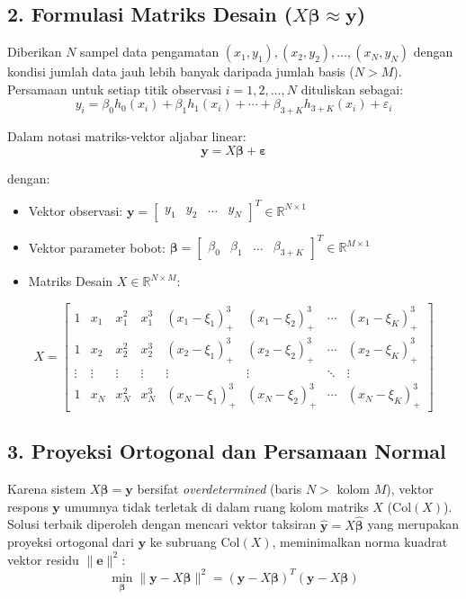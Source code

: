 \documentclass[12pt,a4paper]{report}
\begin{document}
\subsection*{2. Formulasi Matriks Desain ($X\boldsymbol{\beta} \approx \mathbf{y}$)}
Diberikan $N$ sampel data pengamatan $(x_1, y_1), (x_2, y_2), \dots, (x_N, y_N)$ dengan kondisi jumlah data jauh lebih banyak daripada jumlah basis ($N > M$). Persamaan untuk setiap titik observasi $i = 1, 2, \dots, N$ dituliskan sebagai:
\[
y_i = \beta_0 h_0(x_i) + \beta_1 h_1(x_i) + \cdots + \beta_{3+K} h_{3+K}(x_i) + \varepsilon_i
\]

Dalam notasi matriks-vektor aljabar linear:
\[
\mathbf{y} = X\boldsymbol{\beta} + \boldsymbol{\varepsilon}
\]

dengan:
\begin{itemize}[noitemsep]
    \item Vektor observasi: $\mathbf{y} = \begin{bmatrix} y_1 & y_2 & \dots & y_N \end{bmatrix}^T \in \mathbb{R}^{N \times 1}$
    \item Vektor parameter bobot: $\boldsymbol{\beta} = \begin{bmatrix} \beta_0 & \beta_1 & \dots & \beta_{3+K} \end{bmatrix}^T \in \mathbb{R}^{M \times 1}$
    \item Matriks Desain $X \in \mathbb{R}^{N \times M}$:
\end{itemize}

\[
X = \begin{bmatrix}
1 & x_1 & x_1^2 & x_1^3 & (x_1 - \xi_1)_+^3 & (x_1 - \xi_2)_+^3 & \cdots & (x_1 - \xi_K)_+^3 \\
1 & x_2 & x_2^2 & x_2^3 & (x_2 - \xi_1)_+^3 & (x_2 - \xi_2)_+^3 & \cdots & (x_2 - \xi_K)_+^3 \\
\vdots & \vdots & \vdots & \vdots & \vdots & \vdots & \ddots & \vdots \\
1 & x_N & x_N^2 & x_N^3 & (x_N - \xi_1)_+^3 & (x_N - \xi_2)_+^3 & \cdots & (x_N - \xi_K)_+^3
\end{bmatrix}
\]

\subsection*{3. Proyeksi Ortogonal dan Persamaan Normal}
Karena sistem $X\boldsymbol{\beta} = \mathbf{y}$ bersifat \textit{overdetermined} (baris $N >$ kolom $M$), vektor respons $\mathbf{y}$ umumnya tidak terletak di dalam ruang kolom matriks $X$ ($\text{Col}(X)$). Solusi terbaik diperoleh dengan mencari vektor taksiran $\hat{\mathbf{y}} = X\hat{\boldsymbol{\beta}}$ yang merupakan proyeksi ortogonal dari $\mathbf{y}$ ke subruang $\text{Col}(X)$, meminimalkan norma kuadrat vektor residu $\|\mathbf{e}\|^2$:
\[
\min_{\boldsymbol{\beta}} \|\mathbf{y} - X\boldsymbol{\beta}\|^2 = (\mathbf{y} - X\boldsymbol{\beta})^T (\mathbf{y} - X\boldsymbol{\beta})
\]
\end{document}
